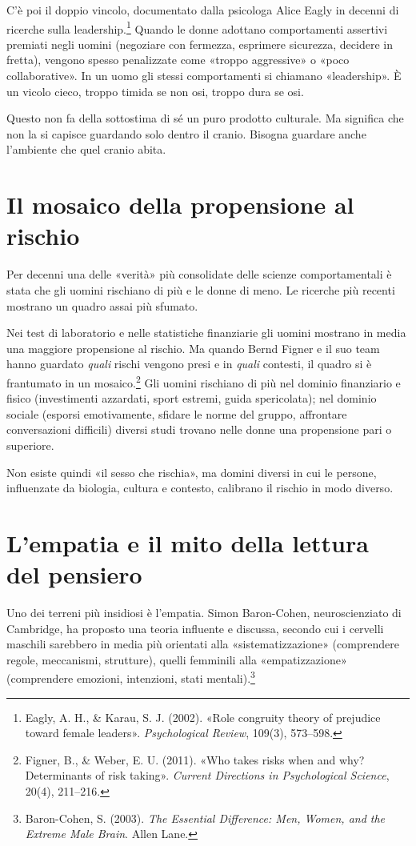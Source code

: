 C'è poi il doppio vincolo, documentato dalla psicologa Alice Eagly in decenni di ricerche sulla leadership.\footnote{Eagly, A. H., \& Karau, S. J. (2002). «Role congruity theory of prejudice toward female leaders». \textit{Psychological Review}, 109(3), 573--598.} Quando le donne adottano comportamenti assertivi premiati negli uomini (negoziare con fermezza, esprimere sicurezza, decidere in fretta), vengono spesso penalizzate come «troppo aggressive» o «poco collaborative». In un uomo gli stessi comportamenti si chiamano «leadership». È un vicolo cieco, troppo timida se non osi, troppo dura se osi.

Questo non fa della sottostima di sé un puro prodotto culturale. Ma significa che non la si capisce guardando solo dentro il cranio. Bisogna guardare anche l'ambiente che quel cranio abita.

\section{Il mosaico della propensione al rischio}

Per decenni una delle «verità» più consolidate delle scienze comportamentali è stata che gli uomini rischiano di più e le donne di meno. Le ricerche più recenti mostrano un quadro assai più sfumato.

Nei test di laboratorio e nelle statistiche finanziarie gli uomini mostrano in media una maggiore propensione al rischio. Ma quando Bernd Figner e il suo team hanno guardato \textit{quali} rischi vengono presi e in \textit{quali} contesti, il quadro si è frantumato in un mosaico.\footnote{Figner, B., \& Weber, E. U. (2011). «Who takes risks when and why? Determinants of risk taking». \textit{Current Directions in Psychological Science}, 20(4), 211--216.} Gli uomini rischiano di più nel dominio finanziario e fisico (investimenti azzardati, sport estremi, guida spericolata); nel dominio sociale (esporsi emotivamente, sfidare le norme del gruppo, affrontare conversazioni difficili) diversi studi trovano nelle donne una propensione pari o superiore.

Non esiste quindi «il sesso che rischia», ma domini diversi in cui le persone, influenzate da biologia, cultura e contesto, calibrano il rischio in modo diverso.
\section{L'empatia e il mito della lettura del pensiero}

Uno dei terreni più insidiosi è l'empatia. Simon Baron-Cohen, neuroscienziato di Cambridge, ha proposto una teoria influente e discussa, secondo cui i cervelli maschili sarebbero in media più orientati alla «sistematizzazione» (comprendere regole, meccanismi, strutture), quelli femminili alla «empatizzazione» (comprendere emozioni, intenzioni, stati mentali).\footnote{Baron-Cohen, S. (2003). \textit{The Essential Difference: Men, Women, and the Extreme Male Brain}. Allen Lane.}

